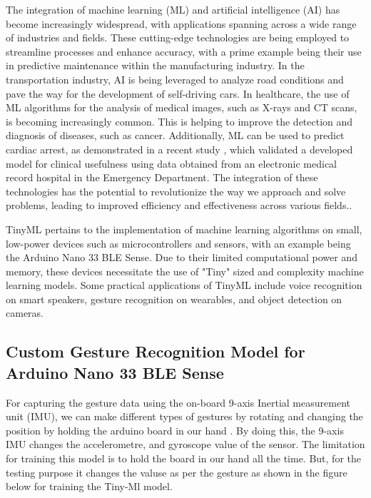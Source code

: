 The integration of machine learning (ML) and artificial intelligence (AI) has become increasingly widespread, with applications spanning across a wide range of industries and fields. These cutting-edge technologies are being employed to streamline processes and enhance accuracy, with a prime example being their use in predictive maintenance within the manufacturing industry.
In the transportation industry, AI is being leveraged to analyze road conditions and pave the way for the development of self-driving cars. In healthcare, the use of ML algorithms for the analysis of medical images, such as X-rays and CT scans, is becoming increasingly common. This is helping to improve the detection and diagnosis of diseases, such as cancer. Additionally, ML can be used to predict cardiac arrest, as demonstrated in a recent study \cite{JMIR:2020}, which validated a developed model for clinical usefulness using data obtained from an electronic medical record hospital in the Emergency Department. The integration of these technologies has the potential to revolutionize the way we approach and solve problems, leading to improved efficiency and effectiveness across various fields..%
 
TinyML pertains to the implementation of machine learning algorithms on small, low-power devices such as microcontrollers and sensors, with an example being the Arduino Nano 33 BLE Sense. Due to their limited computational power and memory, these devices necessitate the use of "Tiny" sized and complexity machine learning models. Some practical applications of TinyML include voice recognition on smart speakers, gesture recognition on wearables, and object detection on cameras.
\subsection{Custom Gesture Recognition Model  for Arduino Nano 33 BLE Sense}

For capturing the gesture data using the on-board 9-axis Inertial measurement unit (IMU), we can make different types of gestures by rotating and changing the position by holding the arduino board in our hand . By doing this, the 9-axis IMU changes the accelerometre, and gyroscope value of the sensor. The limitation for training this model is to hold the board in our hand all the time. But, for the testing purpose it changes the valuse as per the gesture as shown in the figure below %
for training the Tiny-Ml model.%

